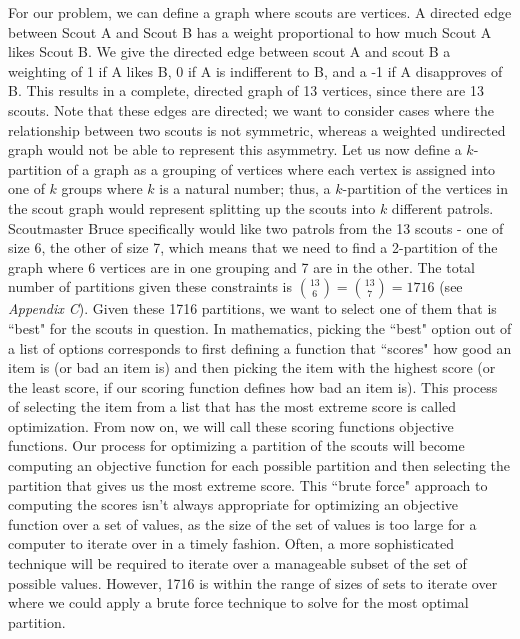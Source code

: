 \documentclass{amsart}
\theoremstyle{definition}
\theoremstyle{remark}
\numberwithin{equation}{section}
\begin{document}
For our problem, we can define a graph where scouts are vertices. A directed edge between Scout A and Scout B has a weight proportional to how much Scout A likes Scout B. We give the directed edge between scout A and scout B a weighting of 1 if A likes B, 0 if A is indifferent to B, and a -1 if A disapproves of B. This results in a complete, directed graph of 13 vertices, since there are 13 scouts. Note that these edges are directed; we want to consider cases where the relationship between two scouts is not symmetric, whereas a weighted undirected graph would not be able to represent this asymmetry. Let us now define a $k$-partition of a graph as a grouping of vertices where each vertex is assigned into one of $k$ groups where $k$ is a natural number; thus, a $k$-partition of the vertices in the scout graph would represent splitting up the scouts into $k$ different patrols. Scoutmaster Bruce specifically would like two patrols from the 13 scouts - one of size 6, the other of size 7, which means that we need to find a 2-partition of the graph where 6 vertices are in one grouping and 7 are in the other. The total number of partitions given these constraints is $\binom{13}{6} = \binom{13}{7} = 1716$ (see \textit{Appendix C}). Given these 1716 partitions, we want to select one of them that is ``best" for the scouts in question. In mathematics, picking the ``best" option out of a list of options corresponds to first defining a function that ``scores" how good an item is (or bad an item is) and then picking the item with the highest score (or the least score, if our scoring function defines how bad an item is). This process of selecting the item from a list that has the most extreme score is called optimization. From now on, we will call these scoring functions objective functions. Our process for optimizing a partition of the scouts will become computing an objective function for each possible partition and then selecting the partition that gives us the most extreme score. This ``brute force" approach to computing the scores isn't always appropriate for optimizing an objective function over a set of values, as the size of the set of values is too large for a computer to iterate over in a timely fashion. Often, a more sophisticated technique will be required to iterate over a manageable subset of the set of possible values. However, 1716 is within the range of sizes of sets to iterate over where we could apply a brute force technique to solve for the most optimal partition.
\end{document}

